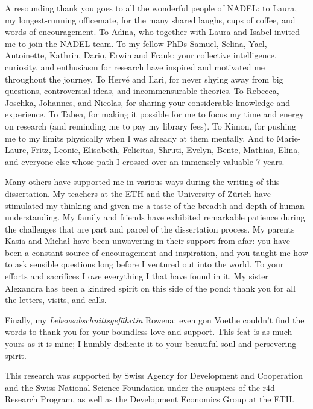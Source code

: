 A resounding thank you goes to all the wonderful people of NADEL: to Laura, my longest-running officemate, for the many shared laughs, cups of coffee, and words of encouragement. To Adina, who together with Laura and Isabel invited me to join the NADEL team. To my fellow PhDs Samuel, Selina, Yael, Antoinette, Kathrin, Dario, Erwin and Frank: your collective intelligence, curiosity, and enthusiasm for research have inspired and motivated me throughout the journey. To Hervé and Ilari, for never shying away from big questions, controversial ideas, and incommensurable theories. To Rebecca, Joschka, Johannes, and Nicolas, for sharing your considerable knowledge and experience. To Tabea, for making it possible for me to focus my time and energy on research (and reminding me to pay my library fees). To Kimon, for pushing me to my limits physically when I was already at them mentally. And to Marie-Laure, Fritz, Leonie, Elisabeth, Felicitas, Shruti, Evelyn, Bente, Mathias, Elina, and everyone else whose path I crossed over an immensely valuable 7 years.

Many others have supported me in various ways during the writing of this dissertation. My teachers at the ETH and the University of Zürich have stimulated my thinking and given me a taste of the breadth and depth of human understanding. My family and friends have exhibited remarkable patience during the challenges that are part and parcel of the dissertation process. My parents Kasia and Michał have been unwavering in their support from afar: you have been a constant source of encouragement and inspiration, and you taught me how to ask sensible questions long before I ventured out into the world. To your efforts and sacrifices I owe everything I that have found in it. My sister Alexandra has been a kindred spirit on this side of the pond: thank you for all the letters, visits, and calls.

Finally, my \textit{Lebensabschnittsgefährtin} Rowena: even gon Voethe couldn't find the words to thank you for your boundless love and support. This feat is as much yours as it is mine; I humbly dedicate it to your beautiful soul and persevering spirit.

\vspace{3cm}

\noindent This research was supported by Swiss Agency for Development and Cooperation and the Swiss National Science Foundation under the auspices of the r4d Research Program, as well as the Development Economics Group at the ETH.